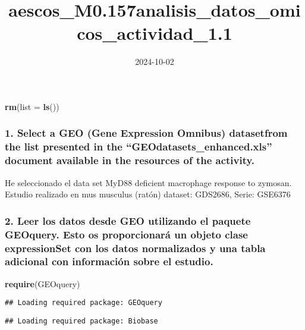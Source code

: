 \documentclass[
]{article}
\title{aescos\_M0.157analisis\_datos\_omicos\_actividad\_1.1}
\author{}
\date{\vspace{-2.5em}2024-10-02}
\newenvironment{Shaded}{\begin{snugshade}}{\end{snugshade}}
\newcommand{\AttributeTok}[1]{\textcolor[rgb]{0.13,0.29,0.53}{#1}}
\newcommand{\FunctionTok}[1]{\textcolor[rgb]{0.13,0.29,0.53}{\textbf{#1}}}
\newcommand{\NormalTok}[1]{#1}
\begin{document}
\maketitle

\begin{Shaded}
\begin{Highlighting}[]
\FunctionTok{rm}\NormalTok{(}\AttributeTok{list =} \FunctionTok{ls}\NormalTok{())}
\end{Highlighting}
\end{Shaded}

\subsubsection{1. Select a GEO (Gene Expression Omnibus) datasetfrom the
list presented in the ``GEOdatasets\_enhanced.xls'' document available
in the resources of the
activity.}\label{select-a-geo-gene-expression-omnibus-datasetfrom-the-list-presented-in-the-geodatasets_enhanced.xls-document-available-in-the-resources-of-the-activity.}

He seleccionado el data set MyD88 deficient macrophage response to
zymosan. Estudio realizado en mus musculus (ratón) dataset: GDS2686,
Serie: GSE6376

\subsubsection{2. Leer los datos desde GEO utilizando el paquete
GEOquery. Esto os proporcionará un objeto clase expressionSet con los
datos normalizados y una tabla adicional con información sobre el
estudio.}\label{leer-los-datos-desde-geo-utilizando-el-paquete-geoquery.-esto-os-proporcionaruxe1-un-objeto-clase-expressionset-con-los-datos-normalizados-y-una-tabla-adicional-con-informaciuxf3n-sobre-el-estudio.}

\begin{Shaded}
\begin{Highlighting}[]
\FunctionTok{require}\NormalTok{(GEOquery)}
\end{Highlighting}
\end{Shaded}

\begin{verbatim}
## Loading required package: GEOquery
\end{verbatim}

\begin{verbatim}
## Loading required package: Biobase
\end{verbatim}
\end{document}
